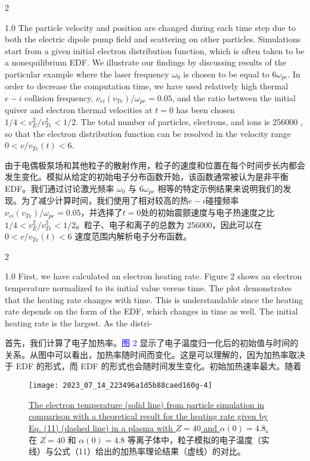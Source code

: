 \documentclass[oneside,onecolumn]{article}
\newcommand\enzhbox[2]{
  	\quad\par \begin{paracol}{2} \colseprulecolor{black} 
  			\begin{spacing}{1.0}
  				\footnotesize  #1
  			\end{spacing}
  		\switchcolumn[1] 
  		#2
  	\end{paracol} 
  }
\begin{document}
\begin{sloppypar}
{}
  
 
\enzhbox{   The particle velocity and position are changed during each time step due to both the electric dipole pump field and scattering on other particles. Simulations start from a given initial electron distribution function, which is often taken to be a nonequilibrium EDF. We illustrate our findings by discussing results of the particular example where the laser frequency $\omega_{0}$ is chosen to be equal to $6 \omega_{p e}$. In order to decrease the computation time, we have used relatively high thermal $e-i$ collision frequency, $\nu_{e i}\left(v_{T e}\right) / \omega_{p e}=0.05$, and the ratio between the initial quiver and electron thermal velocities at $t=0$ has been chosen $1 / 4<v_{E}^{2} / v_{T e}^{2}<1 / 2$. The total number of particles, electrons, and ions is 256000 , so that the electron distribution function can be resolved in the velocity range $0<v / v_{T e}(t)<6$.
}{
由于电偶极泵场和其他粒子的散射作用，粒子的速度和位置在每个时间步长内都会发生变化。模拟从给定的初始电子分布函数开始，该函数通常被认为是非平衡 EDF。我们通过讨论激光频率 $\omega_{0}$ 与 $6 \omega_{p e}$ 相等的特定示例结果来说明我们的发现。为了减少计算时间，我们使用了相对较高的热$e-i$碰撞频率$\nu_{e i}\left(v_{T e}\right) / \omega_{p e}=0.05$，并选择了$t=0$处的初始震颤速度与电子热速度之比$1 / 4<v_{E}^{2} / v_{T e}^{2}<1 / 2$。粒子、电子和离子的总数为 256000，因此可以在 $0<v / v_{T e}(t)<6$ 速度范围内解析电子分布函数。

}
  
 
\enzhbox{   First, we have calculated an electron heating rate. Figure 2 shows an electron temperature normalized to its initial value versus time. The plot demonstrates that the heating rate changes with time. This is understandable since the heating rate depends on the form of the EDF, which changes in time as well. The initial heating rate is the largest. As the distri-
}{
首先，我们计算了电子加热率。\textcolor{blue}{图 2} 显示了电子温度归一化后的初始值与时间的关系。从图中可以看出，加热率随时间而变化。这是可以理解的，因为加热率取决于 EDF 的形式，而 EDF 的形式也会随时间发生变化。初始加热速率最大。随着

}
  
  \begin{figure}[bp]
  	\centering
  	\texttt{[image: 2023\_07\_14\_223496a1d5b88caed160g-4]}
  	\caption{\uline{The electron temperature (solid line) from particle simulation in comparison with a theoretical result for the heating rate given by Eq. (11) (dashed line) in a plasma with $Z=40$ and $\alpha(0)=4.8$.}\\在 $Z=40$ 和 $\alpha(0)=4.8$ 等离子体中，粒子模拟的电子温度（实线）与公式（11）给出的加热率理论结果（虚线）的对比。}
  	\label{fig2.}
  \end{figure}
  

\end{sloppypar}
\end{document}
